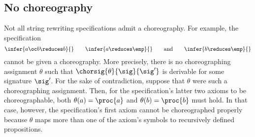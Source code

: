 \clearpage
\subsection{No choreography}

Not all string rewriting specifications admit a choreography.
For example, the specification
\begin{equation*}
  \infer{a \oc b \reduces b}{}
  \qquad
  \infer{a \reduces \emp}{}
  \qquad\text{and}\qquad
  \infer{b \reduces \emp}{}
\end{equation*}
cannot be given a choreography.
More precisely, there is no choreographing assignment $\theta$ such that $\chorsig{\theta}{\sig}{\sig'}$ is derivable for some signature $\sig'$.
For the sake of contradiction, suppose that $\theta$ were such a choreographing assignment.
Then, for the specification's latter two axioms to be choreographable, both $\theta(a) = \proc{a}$ and $\theta(b) = \proc{b}$ must hold.
In that case, however, the specification's first axiom cannot be choreographed properly because $\theta$ maps more than one of the axiom's symbols to recursively defined propositions.



